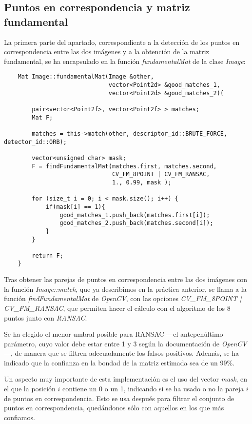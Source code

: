 \documentclass[a4paper, 11pt]{article}
\theoremstyle{definition}
\theoremstyle{theorem}
\begin{document}
    \subsection{Puntos en correspondencia y matriz fundamental}
    La primera parte del apartado, correspondiente a la detección de los puntos en correspondencia entre las dos imágenes y a la obtención de la matriz fundamental, se ha encapsulado en la función \emph{fundamentalMat} de la clase \emph{Image}:

    \begin{lstlisting}
    Mat Image::fundamentalMat(Image &other,
                              vector<Point2d> &good_matches_1,
                              vector<Point2d> &good_matches_2){

        pair<vector<Point2f>, vector<Point2f> > matches;
        Mat F;

        matches = this->match(other, descriptor_id::BRUTE_FORCE, detector_id::ORB);

        vector<unsigned char> mask;
        F = findFundamentalMat(matches.first, matches.second,
                               CV_FM_8POINT | CV_FM_RANSAC,
                               1., 0.99, mask );

        for (size_t i = 0; i < mask.size(); i++) {
            if(mask[i] == 1){
                good_matches_1.push_back(matches.first[i]);
                good_matches_2.push_back(matches.second[i]);
            }
        }

        return F;
    }
    \end{lstlisting}

    Tras obtener las parejas de puntos en correspondencia entre las dos imágenes con la función \emph{Image::match}, que ya describimos en la práctica anterior, se llama a la función \emph{findFundamentalMat} de \emph{OpenCV}, con las opciones \emph{CV\_FM\_8POINT | CV\_FM\_RANSAC}, que permiten hacer el cálculo con el algoritmo de los 8 puntos junto con \emph{RANSAC}.

    Se ha elegido el menor umbral posible para RANSAC ---el antepenúltimo parámetro, cuyo valor debe estar entre 1 y 3 según la documentación de \emph{OpenCV}---, de manera que se filtren adecuadamente los falsos positivos. Además, se ha indicado que la confianza en la bondad de la matriz estimada sea de un 99\%.

    Un aspecto muy importante de esta implementación es el uso del vector \emph{mask}, en el que la posición $i$ contiene un 0 o un 1, indicando si se ha usado o no la pareja $i$ de puntos en correspondencia. Esto se usa después para filtrar el conjunto de puntos en correspondencia, quedándonos sólo con aquellos en los que más confiamos.
\end{document}
